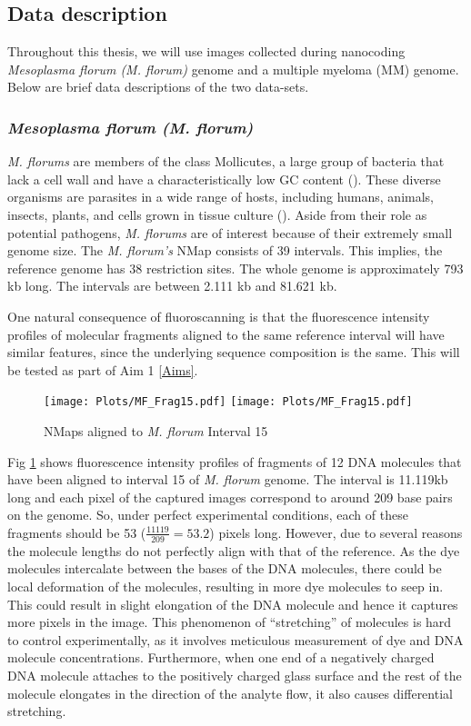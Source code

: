\subsection{Data description} \label{Ch2_data}
Throughout this thesis, we will use images collected during nanocoding {\emph{Mesoplasma florum (M. florum)}} genome and a multiple myeloma (MM) genome. Below are brief data descriptions of the two data-sets.
\subsubsection*{\emph{Mesoplasma florum (M. florum)}}
{\emph{M. florums}} are members of the class Mollicutes, a large group of bacteria that lack a cell wall and have a characteristically low GC content (\cite{Razin_etal_1998_MMBR}). These diverse organisms are parasites in a wide range of hosts, including humans, animals, insects, plants, and cells grown in tissue culture (\cite{Razin_etal_1998_MMBR}). Aside from their role as potential pathogens, {\emph{M. florums}} are of interest because of their extremely small genome size. The {\emph{M. florum's}} NMap consists of 39 intervals. This implies, the reference genome has 38 restriction sites. The whole genome is approximately 793 kb long. The intervals are between 2.111 kb and 81.621 kb. 

One natural consequence of fluoroscanning is that the fluorescence intensity profiles of molecular fragments aligned to the same reference interval will have similar features, since the underlying sequence composition is the same. This will be tested as part of Aim 1 \ref{Aims}. 

\begin{figure}[H]
\begin{center}
\texttt{[image: Plots/MF\_Frag15.pdf]}
\texttt{[image: Plots/MF\_Frag15.pdf]}
\end{center}
\caption{NMaps aligned to {\emph{M. florum}} Interval 15}
\label{fig:Fig2_MF_Frag15}
\end{figure}

Fig \ref{fig:Fig2_MF_Frag15} shows fluorescence intensity profiles of fragments of 12 DNA molecules that have been aligned to interval 15 of {\emph{M. florum}} genome. The interval is 11.119kb long and each pixel of the captured images correspond to around 209 base pairs on the genome. So, under perfect experimental conditions, each of these fragments should be 53 ($\frac{11119}{209} = 53.2$) pixels long. However, due to several reasons the molecule lengths do not perfectly align with that of the reference. As the dye molecules intercalate between the bases of the DNA molecules, there could be local deformation of the molecules, resulting in more dye molecules to seep in. This could result in slight elongation of the DNA molecule and hence it captures more pixels in the image. This phenomenon of ``stretching'' of molecules is hard to control experimentally, as it involves meticulous measurement of dye and DNA molecule concentrations. Furthermore, when one end of a negatively charged DNA molecule attaches to the positively charged glass surface and the rest of the molecule elongates in the direction of the analyte flow, it also causes differential stretching. 


